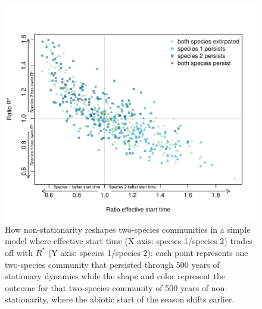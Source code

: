 \documentclass[11pt,letterpaper]{article}
\begin{document}
\begin{figure}[t!]
\centering
\includegraphics[width=1\textwidth]{..//..//R/graphs/modelruns/manuscript/tauIPrstart1.pdf}
\caption{How non-stationarity reshapes two-species communities in a simple model where effective start time (X axis: species 1/species 2) trades off with $R^*$ (Y axis: species 1/species 2): each point represents one two-species community that persisted through 500 years of stationary dynamics while the shape and color represent the outcome for that two-species community of 500 years of non-stationarity, where the abiotic start of the season shifts earlier.}
  \label{fig:tauirstar}
\end{figure}
\end{document}
